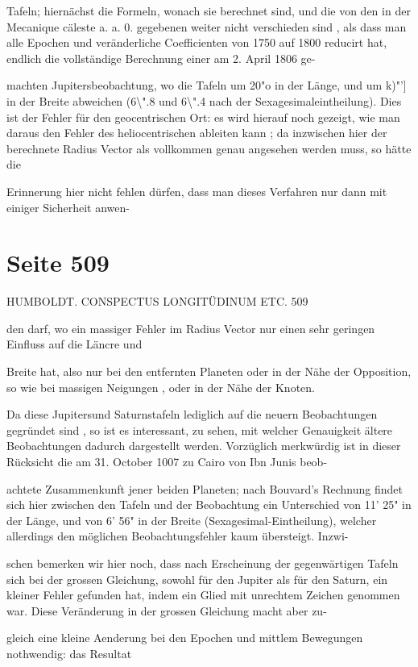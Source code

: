 \documentclass[10pt,a4paper]{article}
\begin{document}
Tafeln; hiernächst die Formeln, wonach sie berechnet sind, und die von den in der Mecanique cäleste a. a. 0. gegebenen weiter nicht verschieden sind , als dass man alle Epochen und veränderliche Coefficienten von 1750 auf 1800 reducirt hat, endlich die vollständige Berechnung einer am 2. April 1806 ge-

machten Jupitersbeobachtung, wo die Tafeln um 20"o in der Länge, und um k)"'] in der Breite abweichen (6\textbackslash{}".8 und 6\textbackslash{}".4 nach der Sexagesimaleintheilung). Dies ist der Fehler für den geocentrischen Ort: es wird hierauf noch gezeigt, wie man daraus den Fehler des heliocentrischen ableiten kann ; da inzwischen hier der berechnete Radius Vector als vollkommen genau angesehen werden muss, so hätte die

Erinnerung hier nicht fehlen dürfen, dass man dieses Verfahren nur dann mit einiger Sicherheit anwen-


\newpage
\section*{Seite 509}
HUMBOLDT. CONSPECTUS LONGITÜDINUM ETC. 509

den darf, wo ein massiger Fehler im Radius Vector nur einen sehr geringen Einfluss auf die Läncre und

Breite hat, also nur bei den entfernten Planeten oder in der Nähe der Opposition, so wie bei massigen Neigungen , oder in der Nähe der Knoten.

Da diese Jupitersund Saturnstafeln lediglich auf die neuern Beobachtungen gegründet sind , so ist es interessant, zu sehen, mit welcher Genauigkeit ältere Beobachtungen dadurch dargestellt werden. Vorzüglich merkwürdig ist in dieser Rücksicht die am 31. October 1007 zu Cairo von Ibn Junis beob-

achtete Zusammenkunft jener beiden Planeten; nach Bouvard's Rechnung findet sich hier zwischen den Tafeln und der Beobachtung ein Unterschied von 11' 25" in der Länge, und von 6' 56" in der Breite (Sexagesimal-Eintheilung), welcher allerdings den möglichen Beobachtungsfehler kaum übersteigt. Inzwi-

schen bemerken wir hier noch, dass nach Erscheinung der gegenwärtigen Tafeln sich bei der grossen Gleichung, sowohl für den Jupiter als für den Saturn, ein kleiner Fehler gefunden hat, indem ein Glied mit unrechtem Zeichen genommen war. Diese Veränderung in der grossen Gleichung macht aber zu-

gleich eine kleine Aenderung bei den Epochen und mittlem Bewegungen nothwendig: das Resultat
\end{document}
